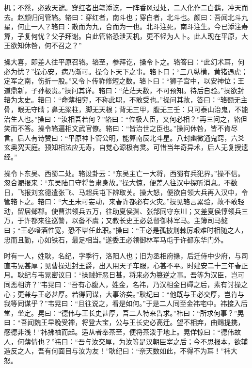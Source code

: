 机；不然，必致天谴。穿红者出笔添讫，一阵香风过处，二人化作二白鹤，冲天而去。赵颜归问管辂。辂曰：穿红者，南斗也；穿白者，北斗也。颜曰：吾闻北斗九星，何止一人？辂曰：散而为九，合而为一也。北斗注死，南斗注生。今已添注寿算，子复何忧？父子拜谢。自此管辂恐泄天机，更不轻为人卜。此人现在平原，大王欲知休咎，何不召之？”

操大喜，即差人往平原召辂。辂至，参拜讫，操令卜之。辂答曰：“此幻术耳，何必为忧？”操心安，病乃渐可。操令卜天下之事。辂卜曰；“三八纵横，黄猪遇虎；定军之南，伤折一股。”又令卜传祚修短之数。辂卜曰：“狮子宫中，以安神位；王道鼎新，子孙极贵。”操问其详。辂曰：“茫茫天数，不可预知。待后自验。”操欲封辂为太史。辂曰：“命薄相穷，不称此职，不敢受也。”操问其故，答曰：“辂额无主骨，眼无守睛；鼻无梁柱，脚无天根；背无三甲，腹无三壬：只可泰山治鬼，不能治生人也。”操曰：“汝相吾若何？”辂曰：“位极人臣，又何必相？”再三问之，辂但笑而不答。操令辂遍相文武官僚。辂曰：“皆治世之臣也。”操问休咎，皆不肯尽言。后人有诗赞曰：“平原神卜管公明，能算南辰北斗星。八封幽微通鬼窍，六爻玄奥究天庭。预知相法应无寿，自觉心源极有灵。可惜当年奇异术，后人无复授遗经。”

操令卜东吴、西蜀二处。辂设卦云：“东吴主亡一大将，西蜀有兵犯界。”操不信。忽合淝报来：“东吴陆口守将鲁肃身故。”操大惊，便差人往汉中探听消息。不数日，飞报刘玄德遣张飞、马超兵屯下辨取关。操大怒，便欲自领大兵再入汉中，令管辂卜之。辂曰：“大王未可妄动，来春许都必有火灾。”操见辂言累验，故不敢轻动，留居邺郡。使曹洪领兵五万，往助夏侯渊、张郃同守东川；又差夏侯惇领兵三万，于许都来往巡警，以备不虞；又教长史王必总督御林军马。主簿司马懿曰；“王必嗜酒性宽，恐不堪任此职。”操曰：“王必是孤披荆棘厉艰难时相随之人，忠而且勤，心如铁石，最足相当。”遂委王必领御林军马屯于许都东华门外。

时有一人，姓耿，名纪，字季行，洛阳人也；旧为丞相府掾，后迁侍中少府，与司直韦晃甚厚；见曹操进封王爵，出入用天子车服，心甚不平。时建安二十三年春正月。耿纪与韦晃密议曰：“操贼奸恶日甚，将来必为篡逆之事。吾等为汉臣，岂可同恶相济？”韦晃曰：“吾有心腹人，姓金，名祎，乃汉相金日磾之后，素有讨操之心；更兼与王必甚厚。若得同谋，大事济矣。”耿纪曰：“他既与王必交厚，岂肯与我等同谋乎？”韦晃曰：“且往说之，看是如何。”于是二人同至金祎宅中。祎接入后堂，坐定。晃曰：“德伟与王长史甚厚，吾二人特来告求。”祎曰：“所求何事？”晃曰：“吾闻魏王早晚受禅，将登大宝，公与王长史必高迁。望不相弃，曲赐提携，感德非浅！”祎拂袖而起。适从者奉茶至，便将茶泼于地上。晃佯惊曰：“德伟故人，何薄情也？”祎曰：“吾与汝交厚，为汝等是汉朝臣宰之后；今不思报本，欲辅造反之人，吾有何面目与汝为友！”耿纪曰：“奈天数如此，不得不为耳！”祎大怒。

